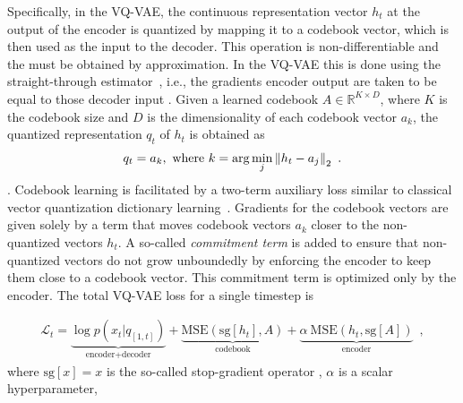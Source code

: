 Specifically, in the VQ-VAE, the continuous representation vector $h_t$ at the output of the encoder is quantized by mapping it to a codebook vector, which is then used as the input to the decoder. This operation is non-differentiable and the  must be obtained by approximation. In the VQ-VAE this is done using the straight-through estimator~\parencite{bengio_estimating_2013}, i.e., the gradients  encoder output are taken to be equal to those  decoder input . Given a learned codebook $A\in\mathbb{R}^{K \times D}$, where $K$ is the codebook size and $D$ is the dimensionality of each codebook vector $a_k$, the quantized representation $q_t$ of $h_t$ is obtained as
\begin{align}
    q_t = a_k, \text{ where } k=\arg\min_j {\left\lVert h_t - a_j\right\rVert}_2 \enspace .
\end{align}
. 
Codebook learning is facilitated by a two-term auxiliary loss similar to
classical vector quantization dictionary 
learning~\parencite{burton_generalization_1983, soong_vector_1985}. 
Gradients for the codebook vectors are given solely by a term that moves
codebook vectors $a_k$ closer to the non-quantized vectors $h_t$. A so-called
\emph{commitment term} is added to ensure that non-quantized vectors do not grow
unboundedly by enforcing the encoder to keep them close to a codebook vector.
This commitment term is optimized only by the encoder. The
total VQ-VAE loss for a single timestep is

\begin{align}
    \mathcal{L}_t = \underset{\text{encoder+decoder}}{\underbrace{\log p(x_t | q_{[1,t]})}}
     + \underset{\text{codebook}}{\underbrace{\text{MSE}\left(\mathrm{sg}\left[h_t\right], A\right)}}
     + \underset{\text{encoder}}{\underbrace{\alpha~\text{MSE}\left(h_t, \mathrm{sg}\left[A\right]\right)}} \enspace ,
    \label{eq: vector quantization losses}
\end{align}%
\noindent where  $\mathrm{sg}[x] = x$ is the so-called stop-gradient operator , $\alpha$ is a scalar hyperparameter, 

